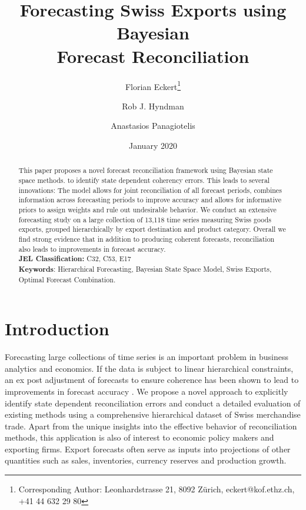 \documentclass[a4paper,fleqn,11pt]{article}
\begin{document}
\title{\huge Forecasting Swiss Exports using Bayesian \\Forecast Reconciliation}

\author[$\dagger$]{Florian Eckert\thanks{Corresponding Author: Leonhardstrasse 21, 8092 Zürich, eckert@kof.ethz.ch, +41 44 632 29 80}}
\author[$\ddagger$]{Rob J. Hyndman}
\author[$\ddagger$]{Anastasios Panagiotelis}
\date{January 2020}

\clearpage\maketitle
\thispagestyle{empty}

\begin{abstract}
	\noindent This paper proposes a novel forecast reconciliation framework using Bayesian state space methods.  to identify state dependent coherency errors. This leads to several innovations: The model allows for joint reconciliation of all forecast periods, combines information across forecasting periods to improve accuracy and allows for informative priors to assign weights and rule out undesirable behavior. We conduct an extensive forecasting study on a large collection of 13,118 time series measuring Swiss goods exports, grouped hierarchically by export destination and product category. Overall we find strong evidence that in addition to producing coherent forecasts, reconciliation also leads to improvements in forecast accuracy.\\
	
	\noindent \textbf{JEL Classification:} C32, C53, E17\\
	\noindent \textbf{Keywords}: Hierarchical Forecasting, Bayesian State Space Model, Swiss Exports, Optimal Forecast Combination.
\end{abstract}
\clearpage
\setcounter{page}{1}

\section{Introduction}\label{sec:intro}

Forecasting large collections of time series is an important problem in business analytics and economics. If the data is subject to linear hierarchical constraints, an ex post adjustment of forecasts to ensure coherence has been shown to lead to improvements in forecast accuracy \citep[see][and references therein]{Wickramasuriya2015}. We propose a novel approach to explicitly identify state dependent reconciliation errors and conduct a detailed evaluation of existing methods using a comprehensive hierarchical dataset of Swiss merchandise trade. Apart from the unique insights into the effective behavior of reconciliation methods, this application is also of interest to economic policy makers and exporting firms. Export forecasts often serve as inputs into projections of other quantities such as sales, inventories, currency reserves and production growth. 
\end{document}
